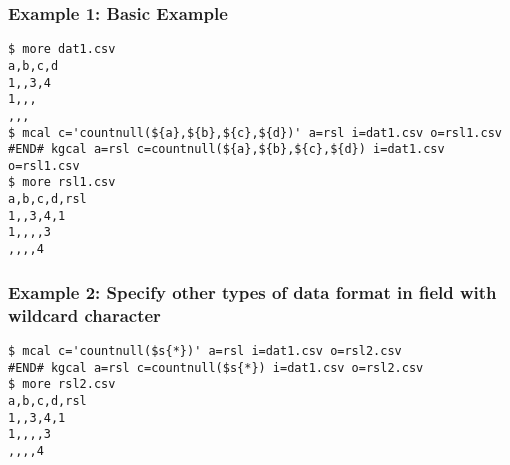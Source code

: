 \subsubsection*{Example 1: Basic Example}



\begin{Verbatim}[baselinestretch=0.7,frame=single]
$ more dat1.csv
a,b,c,d
1,,3,4
1,,,
,,,
$ mcal c='countnull(${a},${b},${c},${d})' a=rsl i=dat1.csv o=rsl1.csv
#END# kgcal a=rsl c=countnull(${a},${b},${c},${d}) i=dat1.csv o=rsl1.csv
$ more rsl1.csv
a,b,c,d,rsl
1,,3,4,1
1,,,,3
,,,,4
\end{Verbatim}
\subsubsection*{Example 2: Specify other types of data format in field with wildcard character}



\begin{Verbatim}[baselinestretch=0.7,frame=single]
$ mcal c='countnull($s{*})' a=rsl i=dat1.csv o=rsl2.csv
#END# kgcal a=rsl c=countnull($s{*}) i=dat1.csv o=rsl2.csv
$ more rsl2.csv
a,b,c,d,rsl
1,,3,4,1
1,,,,3
,,,,4
\end{Verbatim}
